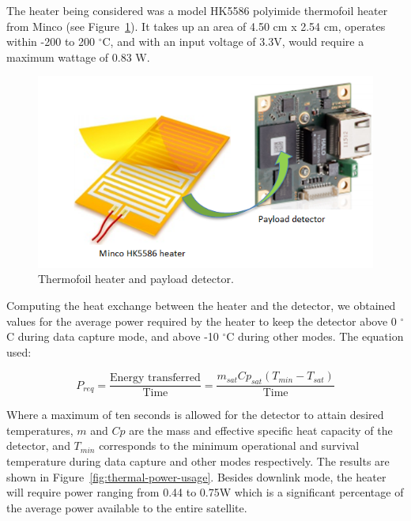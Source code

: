 \documentclass[12pt]{article}
\begin{document}
The heater being considered was a model HK5586 polyimide thermofoil heater from Minco (see Figure~\ref{fig:thermal-heater}). It takes up an area of 4.50 cm x 2.54 cm, operates within -200 to 200 $^\circ$C, and with an input voltage of 3.3V, would require a maximum wattage of 0.83 W. 

\begin{figure}[ht]%
\centering
\includegraphics{images/thermal-heater}%
\caption{Thermofoil heater and payload detector.\cite{minco,ids-imaging}}%
\label{fig:thermal-heater}%
\end{figure}

Computing the heat exchange between the heater and the detector, we obtained values for the average power required by the heater to keep the detector above 0 $^\circ$C during data capture mode, and above -10 $^\circ$C during other modes. The equation used:

\begin{equation}
P_{req} = \frac{\text{Energy transferred}}{\text{Time}} = \frac{m_{sat} Cp_{sat} (T_{min} - T_{sat})}{\text{Time}}
\label{eq:thermal-power-required}
\end{equation}

Where a maximum of ten seconds is allowed for the detector to attain desired temperatures, $m$ and $Cp$ are the mass and effective specific heat capacity of the detector, and $T_{min}$ corresponds to the minimum operational and survival temperature during data capture and other modes respectively. The results are shown in Figure~\ref{fig:thermal-power-usage}. Besides downlink mode, the heater will require power ranging from 0.44 to 0.75W which is a significant percentage of the average power available to the entire satellite.
\end{document}
